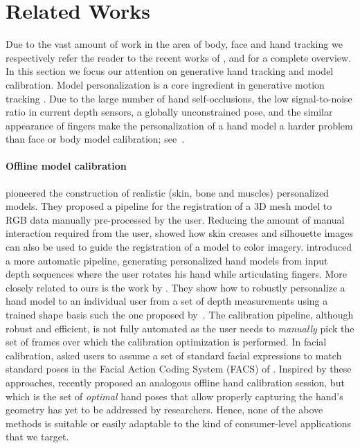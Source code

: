 \section{Related Works}
Due to the vast amount of work in the area of body, face and hand tracking we respectively refer the reader to the recent works of ,  and  for a complete overview. In this section we focus our attention on generative hand tracking and model calibration. Model personalization is a core ingredient in generative motion tracking \cite{pons2011model}.  Due to the large number of hand self-occlusions, the low signal-to-noise ratio in current depth sensors, a globally unconstrained pose, and the similar appearance of fingers make the personalization of a hand model a harder problem than face or body model calibration; see~\cite{supancic2015depth}.

\paragraph{Offline model calibration}
 pioneered the construction of realistic (skin, bone and muscles) personalized models. They proposed a pipeline for the registration of a 3D mesh model to RGB data manually pre-processed by the user. Reducing the amount of manual interaction required from the user,  showed how skin creases and silhouette images can also be used to guide the registration of a model to color imagery.  introduced a more automatic pipeline, generating personalized hand models from input depth sequences where the user rotates his hand while articulating fingers. More closely related to ours is the work by . They show how to robustly personalize a hand model to an individual user from a set of depth measurements using a trained shape basis such the one proposed by~. The calibration pipeline, although robust and efficient, is not fully automated as the user needs to \emph{manually} pick the set of frames over which the calibration optimization is performed. 
In facial calibration,  asked users to assume a set of standard facial expressions to match standard poses in the Facial Action Coding System (FACS) of .
Inspired by these approaches,  recently proposed an analogous offline hand calibration session, but which is the set of \emph{optimal} hand poses that allow properly capturing the hand's geometry has yet to be addressed by researchers. Hence, none of the above methods is suitable or easily adaptable to the kind of consumer-level applications that we target.


